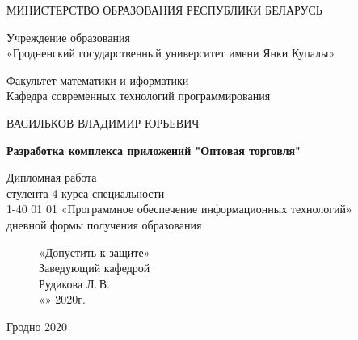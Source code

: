 \begin{titlepage}
    \begin{center}
        МИНИСТЕРСТВО ОБРАЗОВАНИЯ РЕСПУБЛИКИ БЕЛАРУСЬ

        \vspace{0.5cm}

        Учреждение образования \\
        «Гродненский государственный университет имени Янки Купалы»
        \vspace{0.5cm}

        Факультет математики и иформатики \\
        Кафедра современных технологий программирования

        \vfill

        ВАСИЛЬКОВ ВЛАДИМИР ЮРЬЕВИЧ
        \vfill

        {\large\textbf{
            Разработка комплекса приложений "Оптовая торговля"
        }}

        \vfill

        Дипломная работа \\
        стулента 4 курса специальности\\
        1-40 01 01 «Программное обеспечение информационных технологий»\\
        дневной формы получения образования

        \bigskip
    \end{center}
    \vfill

    \newlength{\ML}
    \begin{figure}[!htb]
        \centering
        \begin{minipage}{.5\textwidth}
            «Допустить к защите»\\
            Заведующий кафедрой\\
            \underline{\hspace{\ML}} Рудикова Л.\,В.\\
            «\underline{\hspace{0.7cm}}» \underline{\hspace{2cm}} 2020г.
        \end{minipage}%
        \begin{minipage}[c]{0.5\textwidth}
        \end{minipage}%
    \end{figure}

    \vfill

    \begin{center}
        Гродно 2020
    \end{center}
\end{titlepage}